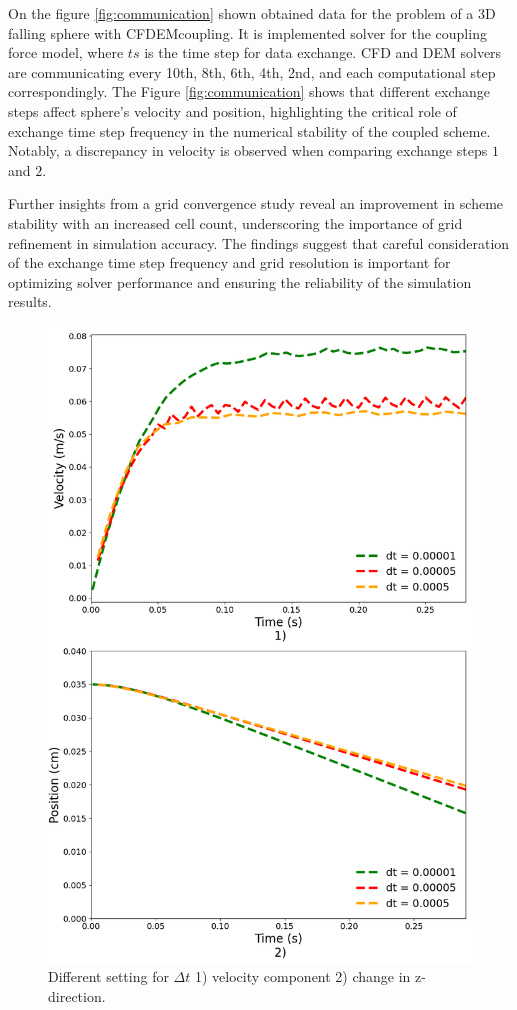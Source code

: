On the figure \ref{fig:communication} shown obtained data for the problem of a 3D falling sphere with CFDEMcoupling. It is implemented solver for the coupling force model, where $ts$ is the time step for data exchange. CFD and DEM solvers are communicating every 10th, 8th, 6th, 4th, 2nd, and each computational step correspondingly. The Figure \ref{fig:communication} shows that different exchange steps affect sphere's velocity and position, highlighting the critical role of exchange time step frequency in the numerical stability of the coupled scheme. Notably, a discrepancy in velocity is observed when comparing exchange steps $1$ and $2$. 

Further insights from a grid convergence study reveal an improvement in scheme stability with an increased cell count, underscoring the importance of grid refinement in simulation accuracy. The findings suggest that careful consideration of the exchange time step frequency and grid resolution is important for optimizing solver performance and ensuring the reliability of the simulation results.
\begin{figure}[H]
    \centering
    \includegraphics[width=12cm]{ GWU_Thesis_Sarmakeeva/Images/chap3/nan_simulation_192000_cells_dt_different.png }
    \caption{ Different setting for $\Delta t$ 1) velocity component 2) change in z-direction.}
    \label{fig:diff_dt}
\end{figure}

